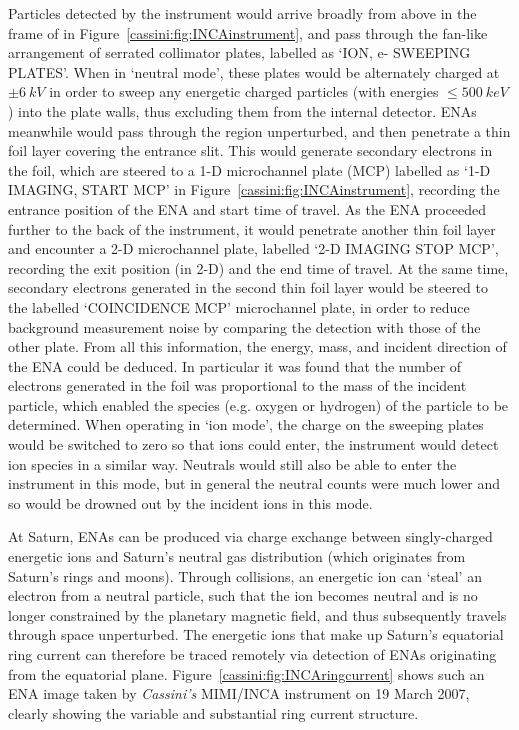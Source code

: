 Particles detected by the instrument would arrive broadly from above in the frame of  in Figure~\ref{cassini:fig:INCAinstrument}, and pass through the fan-like arrangement of serrated collimator plates, labelled as `ION, e- SWEEPING PLATES'. When in `neutral mode', these plates would be alternately charged at $\pm\SI{6}{kV}$ in order to sweep any energetic charged particles (with energies $\leq \SI{500}{keV}$) into the plate walls, thus excluding them from the internal detector. ENAs meanwhile would pass through the region unperturbed, and then penetrate a thin foil layer covering  the entrance slit. This would generate secondary electrons in the foil, which are steered to a 1-D microchannel plate (MCP) labelled as `1-D IMAGING, START MCP' in  Figure~\ref{cassini:fig:INCAinstrument}, recording the entrance position of the ENA and start time of travel. As the ENA proceeded further to the back of the instrument, it would penetrate another thin foil layer and  encounter a 2-D microchannel plate, labelled `2-D IMAGING STOP MCP', recording the exit position (in 2-D) and the end time of travel. At the same time, secondary electrons generated in the second thin foil layer would be steered to the labelled `COINCIDENCE MCP' microchannel plate, in order to reduce background measurement noise by comparing the detection with those of the other plate. From all this information, the energy, mass, and incident direction of the ENA could be deduced. In particular it was found that the number of electrons generated in the foil was proportional to the mass of  the incident particle, which enabled the species (e.g. oxygen or hydrogen) of the particle to be determined. When operating in `ion mode', the  charge on the sweeping plates would be switched to zero so that ions could enter, the instrument would detect ion species in a similar way. Neutrals would still also be able to enter the instrument in this mode, but in general the neutral counts were much lower and so would be drowned out by the incident ions in this mode.

At Saturn, ENAs can be produced via charge exchange between singly-charged energetic ions and Saturn's neutral gas distribution (which originates from Saturn's rings and moons). Through collisions, an energetic ion can `steal' an electron from a neutral particle, such that the ion becomes neutral and is no longer constrained by the planetary magnetic field, and thus subsequently travels through space unperturbed. The energetic ions that make up Saturn's equatorial ring current can therefore be traced remotely via detection of ENAs originating from the equatorial plane. Figure~\ref{cassini:fig:INCAringcurrent} shows such an ENA image taken by \textit{Cassini's} MIMI/INCA instrument  on 19 March 2007, clearly showing the variable and substantial ring current structure. 

